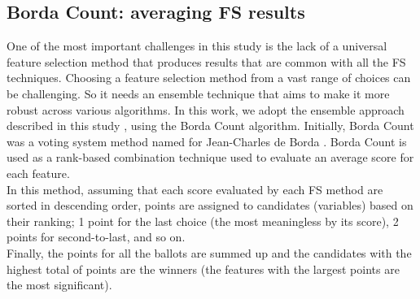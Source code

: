 \subsection{Borda Count: averaging FS results}
One of the most important challenges in this study is the lack of a universal feature selection method that produces results that are common with all the FS techniques. Choosing a feature selection method from a vast range of choices can be challenging. \newline
So it needs an ensemble technique that aims to make it more robust across various algorithms. In this work, we adopt the ensemble approach described in this study \cite{sarkar2014robust}, using the Borda Count algorithm. Initially, Borda Count was a voting system method named for Jean-Charles de Borda \cite{borda1784memoire}.\newline
Borda Count is used as a rank-based combination technique used to evaluate an average score for each feature. \\In this method, assuming that each score evaluated by each FS method are sorted in descending order, points are assigned to candidates (variables) based on their ranking; 1 point for the last choice (the most meaningless by its score), 2 points for second-to-last, and so on. \\Finally, the points for all the ballots are summed up and the candidates with the highest total of points are the winners (the features with the largest points are the most significant).
\bigskip
